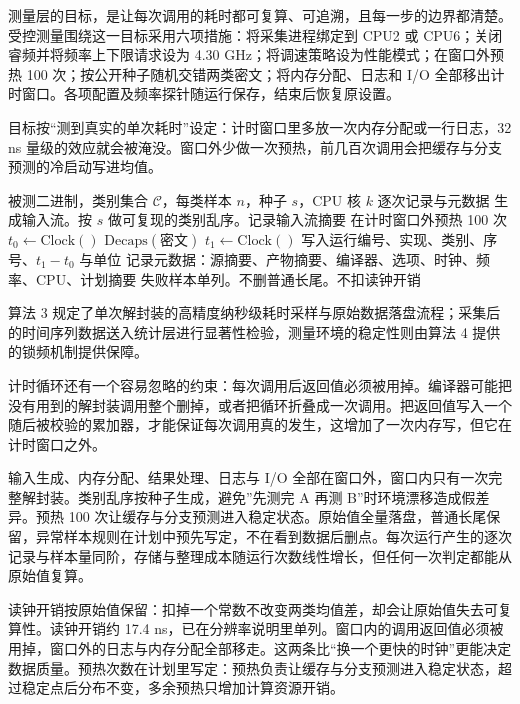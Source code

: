 测量层的目标，是让每次调用的耗时都可复算、可追溯，且每一步的边界都清楚。受控测量围绕这一目标采用六项措施：将采集进程绑定到 CPU2 或 CPU6；关闭睿频并将频率上下限请求设为 4.30 GHz；将调速策略设为性能模式；在窗口外预热 100 次；按公开种子随机交错两类密文；将内存分配、日志和 I/O 全部移出计时窗口。各项配置及频率探针随运行保存，结束后恢复原设置。


目标按“测到真实的单次耗时”设定：计时窗口里多放一次内存分配或一行日志，32 ns 量级的效应就会被淹没。窗口外少做一次预热，前几百次调用会把缓存与分支预测的冷启动写进均值。

\begin{algorithm}[H]
\caption{单次解封装的计时循环}
\label{alg:timing}
\begin{algorithmic}[1]
\Require 被测二进制，类别集合 $\mathcal{C}$，每类样本 $n$，种子 $s$，CPU 核 $k$
\Ensure 逐次记录与元数据
\State 生成输入流。按 $s$ 做可复现的类别乱序。记录输入流摘要
\State 在计时窗口外预热 100 次
  \State $t_0 \gets \mathrm{Clock}()$
  \State $\mathrm{Decaps}(\text{密文})$ 
  \State $t_1 \gets \mathrm{Clock}()$
  \State 写入运行编号、实现、类别、序号、$t_1-t_0$ 与单位
\EndFor
\State 记录元数据：源摘要、产物摘要、编译器、选项、时钟、频率、CPU、计划摘要
\State 失败样本单列。不删普通长尾。不扣读钟开销
\end{algorithmic}
\end{algorithm}

算法 3 规定了单次解封装的高精度纳秒级耗时采样与原始数据落盘流程；采集后的时间序列数据送入统计层进行显著性检验，测量环境的稳定性则由算法 4 提供的锁频机制提供保障。

计时循环还有一个容易忽略的约束：每次调用后返回值必须被用掉。编译器可能把没有用到的解封装调用整个删掉，或者把循环折叠成一次调用。把返回值写入一个随后被校验的累加器，才能保证每次调用真的发生，这增加了一次内存写，但它在计时窗口之外。

输入生成、内存分配、结果处理、日志与 I/O 全部在窗口外，窗口内只有一次完整解封装。类别乱序按种子生成，避免”先测完 A 再测 B”时环境漂移造成假差异。预热 100 次让缓存与分支预测进入稳定状态。原始值全量落盘，普通长尾保留，异常样本规则在计划中预先写定，不在看到数据后删点。每次运行产生的逐次记录与样本量同阶，存储与整理成本随运行次数线性增长，但任何一次判定都能从原始值复算。

读钟开销按原始值保留：扣掉一个常数不改变两类均值差，却会让原始值失去可复算性。读钟开销约 17.4 ns，已在分辨率说明里单列。窗口内的调用返回值必须被用掉，窗口外的日志与内存分配全部移走。这两条比“换一个更快的时钟”更能决定数据质量。预热次数在计划里写定：预热负责让缓存与分支预测进入稳定状态，超过稳定点后分布不变，多余预热只增加计算资源开销。

